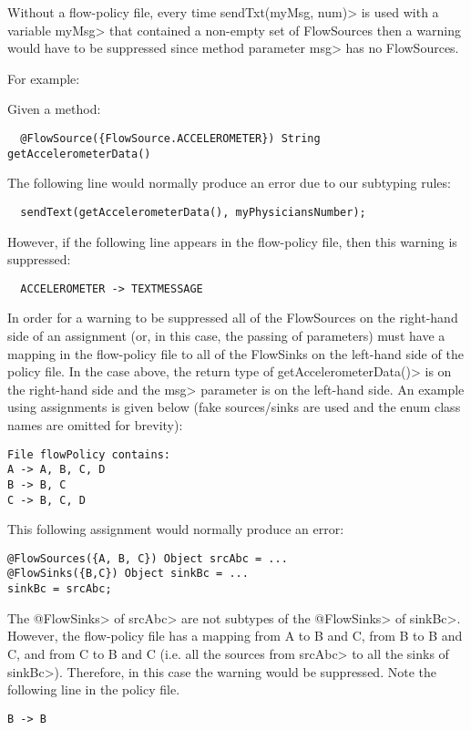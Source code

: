 Without a flow-policy file, every time \<sendTxt(myMsg, num)> is
used with a variable \<myMsg> that contained a non-empty set of
FlowSources then a warning would have to be suppressed since method
parameter \<msg> has no FlowSources.

For example:

Given a method:
\begin{Verbatim}
  @FlowSource({FlowSource.ACCELEROMETER}) String getAccelerometerData()
\end{Verbatim}

The following line would normally produce an error due to our subtyping rules:
\begin{Verbatim}
  sendText(getAccelerometerData(), myPhysiciansNumber);
\end{Verbatim}

However, if the following line appears in the flow-policy file, then this warning is suppressed:
\begin{Verbatim}
  ACCELEROMETER -> TEXTMESSAGE
\end{Verbatim}

In order for a warning to be suppressed all of the FlowSources
on the right-hand side of an assignment (or, in this case, the
passing of parameters) must have a mapping in the flow-policy
file to all of the FlowSinks on the left-hand side of the policy
file.  In the case above, the return type of
\<getAccelerometerData()> is on the right-hand side and the
\<msg> parameter is on the left-hand side.  An example using
assignments is given below  (fake sources/sinks are used and the
enum class names are omitted for brevity):

\begin{Verbatim}
File flowPolicy contains:
A -> A, B, C, D
B -> B, C
C -> B, C, D
\end{Verbatim}

This following assignment would normally produce an error:
\begin{Verbatim}
@FlowSources({A, B, C}) Object srcAbc = ...
@FlowSinks({B,C}) Object sinkBc = ...
sinkBc = srcAbc;
\end{Verbatim}

 The \<@FlowSinks> of \<srcAbc> are not subtypes of the
\<@FlowSinks> of \<sinkBc>.  However, the flow-policy file has a
mapping from A to B and C, from B to B and C, and from C to B
and C (i.e. all the sources from \<srcAbc> to all the sinks of
\<sinkBc>).   Therefore, in this case the warning would be
suppressed.  Note the following line in the policy file.
\begin{Verbatim}
B -> B
\end{Verbatim}

